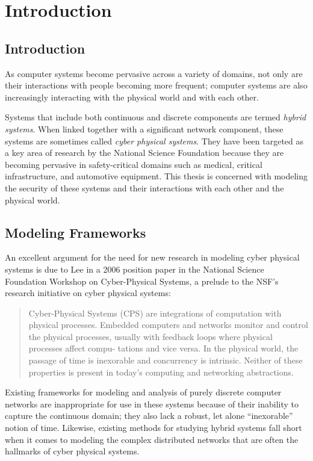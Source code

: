 \chapter{Introduction}
\section{Introduction}
As computer systems become pervasive across a variety of domains, not only are their interactions
with people becoming more frequent; computer systems are also increasingly interacting with the 
physical world and with each other.

Systems that include both continuous and discrete components are termed \emph{hybrid systems}.
When linked together with a significant network component, these systems are sometimes called
\emph{cyber physical systems}. They have been targeted as a key area of research by the National
Science Foundation because they
are becoming pervasive in safety-critical domains such as medical, critical infrastructure, and
automotive equipment. This thesis is concerned with modeling the security of these systems and
their interactions with each other and the physical world.
\section{Modeling Frameworks}
An excellent argument for the need for new research in modeling cyber physical systems
is due to Lee in a 2006 position paper in the National Science Foundation Workshop on Cyber-Physical Systems,
a prelude to the NSF's research initiative on cyber physical systems:
\begin{quote}
Cyber-Physical Systems (CPS) are integrations of computation with physical
processes. Embedded computers and networks monitor and control the physical
processes, usually with feedback loops where physical processes affect compu-
tations and vice versa. In the physical world, the passage of time is inexorable
and concurrency is intrinsic. Neither of these properties is present in today's
computing and networking abstractions. ~\cite{lee2006cyber}
\end{quote}

Existing frameworks for modeling and analysis of purely discrete computer networks are inappropriate for use in
these systems because of their inability to capture the continuous domain; they
also lack a robust, let alone ``inexorable'' notion of time. Likewise, existing
methods for studying hybrid systems fall short when it comes to modeling the complex distributed
networks that are often the hallmarks of cyber physical systems.
